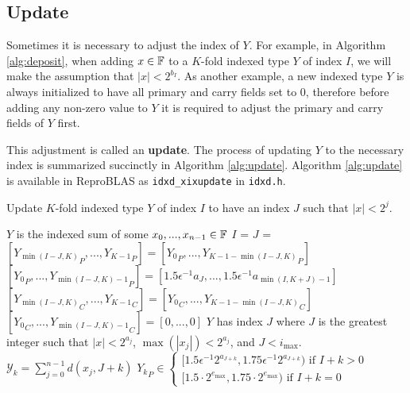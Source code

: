 \subsection{Update}
    \label{sec:primitiveops_update}
    Sometimes it is necessary to adjust the index of $Y$. For example, in Algorithm \ref{alg:deposit}, when adding $x \in \mathbb{F}$ to a $K$-fold
    indexed type $Y$ of index $I$, we will make the assumption that $|x| < 2^{b_I}$.
    As another example, a new indexed type $Y$ is always initialized to have all primary
    and carry fields set to 0, therefore before adding any non-zero value to $Y$
    it is required to adjust the primary and carry fields of $Y$ first.

    This adjustment is called an \textbf{update}.
    The process of updating $Y$ to the necessary index is summarized succinctly
    in Algorithm \ref{alg:update}. Algorithm \ref{alg:update} is available in ReproBLAS as \texttt{idxd\_xixupdate} in \texttt{idxd.h}.

    \begin{samepage}
    \begin{alg}
      Update $K$-fold indexed type $Y$ of index $I$ to have an index $J$ such that $|x| < 2^j$.
      \begin{algorithmic}[1]
        \Require
          \Statex $Y$ is the indexed sum of some $x_0, ..., x_{n - 1} \in \mathbb{F}$
          \State $I$ = 
          \State $J$ = 
            \State $[{Y_{\min(I - J, K)}}_P, ..., {Y_{K - 1}}_P] = [{Y_0}_P, ..., {Y_{K - 1 - \min(I - J, K)}}_P]$
            \State $[{Y_0}_P, ..., {Y_{\min(I - J, K) - 1}}_P] = [1.5  \epsilon^{-1}  a_{J}, ..., 1.5  \epsilon^{-1}  a_{\min(I, K + J) - 1}]$
            \State $[{Y_{\min(I - J, K)}}_C, ..., {Y_{K - 1}}_C] = [{Y_0}_C, ..., {Y_{K - 1 - \min(I - J, K)}}_C]$
            \State $[{Y_0}_C, ..., {Y_{\min(I - J, K) - 1}}_C] = [0, ..., 0]$
          \EndIf
        \EndFunction
        \Ensure
          \Statex $Y$ has index $J$ where $J$ is the greatest integer such that $|x| < 2^{a_j}$, $\max(|x_j|) < 2^{a_j}$, and $J < i_{\max}$.
          \Statex $\mathcal{Y}_k = \sum\limits_{j = 0}^{n - 1} d(x_j, J + k)$
          \Statex ${Y_k}_P \in \begin{cases}[1.5  \epsilon^{-1} 2^{a_{J + k}}, 1.75  \epsilon^{-1} 2^{a_{J + k}}) \text{ if } I + k > 0 \\ [1.5 \cdot 2^{e_{\max}}, 1.75 \cdot 2^{e_{\max}}) \text{ if } I + k = 0\end{cases}$
      \end{algorithmic}
      \label{alg:update}
    \end{alg}
    \end{samepage}

